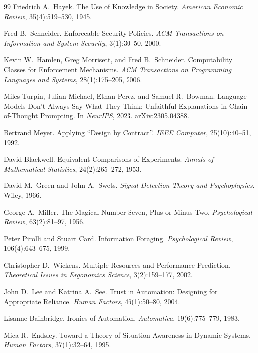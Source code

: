 \documentclass[11pt,a4paper]{article}
\theoremstyle{definition}
\theoremstyle{plain}
\begin{document}
\begin{thebibliography}{99}
Friedrich A.\ Hayek.
\newblock The Use of Knowledge in Society. \textit{American Economic Review}, 35(4):519--530, 1945.

Fred B.\ Schneider.
\newblock Enforceable Security Policies.
\newblock \textit{ACM Transactions on Information and System Security}, 3(1):30--50, 2000.

Kevin W.\ Hamlen, Greg Morrisett, and Fred B.\ Schneider.
\newblock Computability Classes for Enforcement Mechanisms.
\newblock \textit{ACM Transactions on Programming Languages and Systems}, 28(1):175--205, 2006.

Miles Turpin, Julian Michael, Ethan Perez, and Samuel R.\ Bowman.
\newblock Language Models Don't Always Say What They Think: Unfaithful Explanations in Chain-of-Thought Prompting.
\newblock In \textit{NeurIPS}, 2023. arXiv:2305.04388.

Bertrand Meyer.
\newblock Applying ``Design by Contract''.
\newblock \textit{IEEE Computer}, 25(10):40--51, 1992.

David Blackwell.
\newblock Equivalent Comparisons of Experiments.
\newblock \textit{Annals of Mathematical Statistics}, 24(2):265--272, 1953.

David M.\ Green and John A.\ Swets.
\newblock \textit{Signal Detection Theory and Psychophysics}. Wiley, 1966.

George A.\ Miller.
\newblock The Magical Number Seven, Plus or Minus Two.
\newblock \textit{Psychological Review}, 63(2):81--97, 1956.

Peter Pirolli and Stuart Card.
\newblock Information Foraging.
\newblock \textit{Psychological Review}, 106(4):643--675, 1999.

Christopher D.\ Wickens.
\newblock Multiple Resources and Performance Prediction.
\newblock \textit{Theoretical Issues in Ergonomics Science}, 3(2):159--177, 2002.

John D.\ Lee and Katrina A.\ See.
\newblock Trust in Automation: Designing for Appropriate Reliance.
\newblock \textit{Human Factors}, 46(1):50--80, 2004.

Lisanne Bainbridge.
\newblock Ironies of Automation.
\newblock \textit{Automatica}, 19(6):775--779, 1983.

Mica R.\ Endsley.
\newblock Toward a Theory of Situation Awareness in Dynamic Systems.
\newblock \textit{Human Factors}, 37(1):32--64, 1995.


\end{thebibliography}
\end{document}
